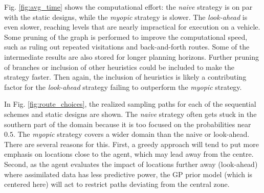 \documentclass[aoas]{imsart}
\begin{document}
Fig.  \ref{fig:avg_time} shows the computational effort: the
\textit{naive} strategy is on par with the static designs, while the
\textit{myopic} strategy is slower. The \textit{look-ahead} is even
slower, reaching levels that are nearly impractical for execution on a
vehicle. Some pruning of the graph is performed to improve the
computational speed, such as ruling out repeated visitations and
back-and-forth routes. Some of the intermediate results are also
stored for longer planning horizons. Further pruning of branches or
inclusion of other heuristics could be included to make the strategy
faster. Then again, the inclusion of heuristics is likely a
contributing factor for the \textit{look-ahead} strategy failing to
outperform the \textit{myopic} strategy.

In Fig. \ref{fig:route_choices}, the realized sampling paths for each
of the sequential schemes and static designs are shown. The
\textit{naive} strategy often gets stuck in the southern part of the
domain because it is too focused on the probabilities near $0.5$. The
\textit{myopic} strategy covers a wider domain than the naive or
look-ahead. There are several reasons for this. First, a greedy
approach will tend to put more emphasis on locations close to the
agent, which may lead away from the centre. Second, as the agent
evaluates the impact of locations further away (look-ahead) where
assimilated data has less predictive power, the GP prior model (which
is centered here) will act to restrict paths deviating from the
central zone.

\end{document}
